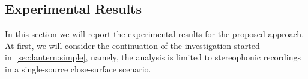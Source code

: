 

\subsection{Experimental Results}\label{sec:mirage:exp}
In this section we will report the experimental results for the proposed approach.
At first, we will consider the continuation of the investigation started in~\cref{sec:lantern:simple}, namely, the analysis is limited to stereophonic recordings in a single-source close-surface scenario.

